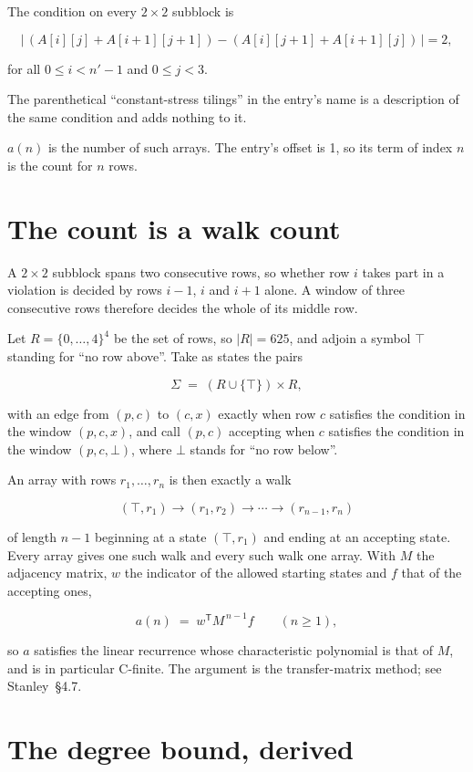 \documentclass[11pt]{article}
\theoremstyle{definition}
\begin{document}
The condition on every $2 \times 2$ subblock is

\[\bigl|\,(A[i][j] + A[i{+}1][j{+}1]) - (A[i][j{+}1] + A[i{+}1][j])\,\bigr| = 2,\]

for all $0 \le i < n'-1$ and $0 \le j < 3$.

The parenthetical ``constant-stress tilings'' in the entry's name is a description of the same condition and adds nothing to it.

$a(n)$ is the number of such arrays. The entry's offset is 1, so its term of index $n$ is the count for $n$ rows.

\section{The count is a walk count}

A $2 \times 2$ subblock spans two consecutive rows, so whether row $i$ takes part in a violation is decided by rows $i-1$, $i$ and $i+1$ alone. A window of three consecutive rows therefore decides the whole of its middle row.

Let $R = \{0,\dots,4\}^{4}$ be the set of rows, so $|R| = 625$, and adjoin a symbol $\top$ standing for ``no row above''. Take as states the pairs

\[\Sigma \;=\; (R \cup \{\top\}) \times R,\]

with an edge from $(p,c)$ to $(c,x)$ exactly when row $c$ satisfies the condition in the window $(p,c,x)$, and call $(p,c)$ accepting when $c$ satisfies the condition in the window $(p,c,\bot)$, where $\bot$ stands for ``no row below''.

An array with rows $r_1,\dots,r_n$ is then exactly a walk

\[(\top,r_1) \to (r_1,r_2) \to \cdots \to (r_{n-1},r_n)\]

of length $n-1$ beginning at a state $(\top,r_1)$ and ending at an accepting state. Every array gives one such walk and every such walk one array. With $M$ the adjacency matrix, $w$ the indicator of the allowed starting states and $f$ that of the accepting ones,

\[a(n) \;=\; w^{\mathsf T} M^{\,n-1} f \qquad (n \ge 1),\]

so $a$ satisfies the linear recurrence whose characteristic polynomial is that of $M$, and is in particular C-finite. The argument is the transfer-matrix method; see Stanley~\S4.7.

\section{The degree bound, derived}
\end{document}
